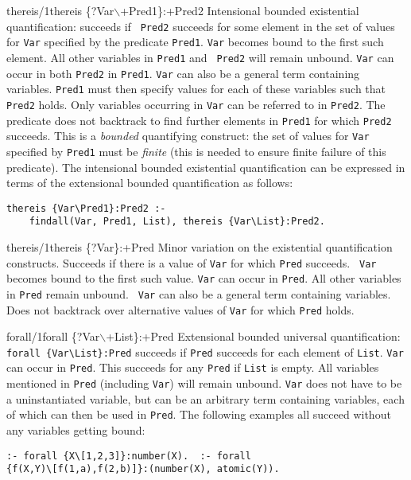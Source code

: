 \begin{predicate}{thereis/1}{thereis \{?Var$\backslash$+Pred1\}:+Pred2}%
Intensional bounded existential quantification: succeeds if {\tt
Pred2} succeeds for some element in the set of values for {\tt Var}
specified by the predicate {\tt Pred1}. {\tt Var} becomes bound to the
first such element.  All other variables in {\tt Pred1} and {\tt
Pred2} will remain unbound.  {\tt Var} can occur in both {\tt Pred2}
in {\tt Pred1}.  {\tt Var} can also be a general term containing
variables. {\tt Pred1} must then specify values for each of these
variables such that {\tt Pred2} holds.  Only variables occurring in
{\tt Var} can be referred to in {\tt Pred2}.  The 
predicate does not backtrack to find further elements in {\tt Pred1}
for which {\tt Pred2} succeeds.  This is a {\em bounded\/} quantifying
construct: the set of values for {\tt Var} specified by {\tt Pred1}
must be {\em finite\/} (this is needed to ensure finite failure of
this predicate). The intensional bounded existential quantification
can be expressed in terms of the extensional bounded quantification as
follows:
\begin{verbatim}
thereis {Var\Pred1}:Pred2 :-
    findall(Var, Pred1, List), thereis {Var\List}:Pred2.
\end{verbatim}
\end{predicate}

\begin{predicate}{thereis/1}{thereis \{?Var\}:+Pred}%
Minor variation on the existential quantification constructs. Succeeds
if there is a value of {\tt Var} for which {\tt Pred} succeeds.  {\tt
Var} becomes bound to the first such value. {\tt Var} can occur in
{\tt Pred}. All other variables in {\tt Pred} remain unbound. {\tt
Var} can also be a general term containing variables. Does not
backtrack over alternative values of {\tt Var} for which {\tt Pred}
holds.
\end{predicate}

\begin{predicate}{forall/1}{forall \{?Var$\backslash$+List\}:+Pred}%
Extensional bounded universal quantification:
                \verb'forall {Var\List}:Pred'
succeeds if {\tt Pred} succeeds for each element of {\tt List}.
{\tt Var} can occur in {\tt Pred}.  This succeeds for any {\tt Pred}
if {\tt List} is empty.  All variables mentioned in {\tt Pred}
(including {\tt Var}) will remain unbound. {\tt Var} does not have to
be a uninstantiated variable, but can be an arbitrary term containing
variables, each of which can then be used in {\tt Pred}.  The
following examples all succeed without any variables getting bound:
\begin{verbatim}
:- forall {X\[1,2,3]}:number(X).  :- forall
{f(X,Y)\[f(1,a),f(2,b)]}:(number(X), atomic(Y)).
\end{verbatim}
\end{predicate}

